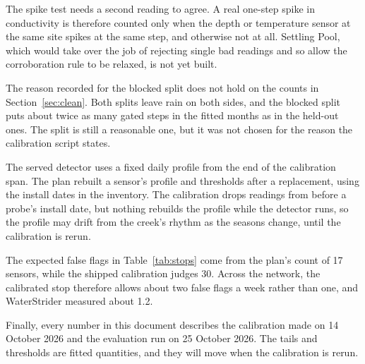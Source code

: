 \documentclass{article}
\begin{document}
The spike test needs a second reading to agree. A real one-step spike in
conductivity is therefore counted only when the depth or temperature sensor at
the same site spikes at the same step, and otherwise not at all. Settling
Pool, which would take over the job of rejecting single bad readings and so
allow the corroboration rule to be relaxed, is not yet built.

The reason recorded for the blocked split does not hold on the counts in
Section~\ref{sec:clean}. Both splits leave rain on both sides, and the blocked
split puts about twice as many gated steps in the fitted months as in the
held-out ones. The split is still a reasonable one, but it was not chosen for
the reason the calibration script states.

The served detector uses a fixed daily profile from the end of the calibration
span. The plan rebuilt a sensor's profile and thresholds after a replacement,
using the install dates in the inventory. The calibration drops readings from
before a probe's install date, but nothing rebuilds the profile while the
detector runs, so the profile may drift from the creek's rhythm as the
seasons change, until the calibration is rerun.

The expected false flags in Table~\ref{tab:stops} come from the plan's count of
17 sensors, while the shipped calibration judges 30. Across the network, the
calibrated stop therefore allows about two false flags a week rather than one,
and WaterStrider measured about 1.2.

Finally, every number in this document describes the calibration made on 14
October 2026 and the evaluation run on 25 October 2026. The tails and
thresholds are fitted quantities, and they will move when the calibration is
rerun.



\end{document}
